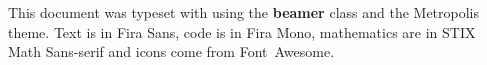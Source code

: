\begin{frame}[plain]
  \begin{adjustwidth}{20mm}{20mm}
    \scriptsize \raggedright %
    This document was typeset with {\XeLaTeX} using the
    \textbf{beamer} class and the Metropolis theme. Text is in Fira
    Sans, code is in Fira Mono, mathematics are in STIX Math
    Sans-serif and icons come from Font~Awesome.
  \end{adjustwidth}
\end{frame}

